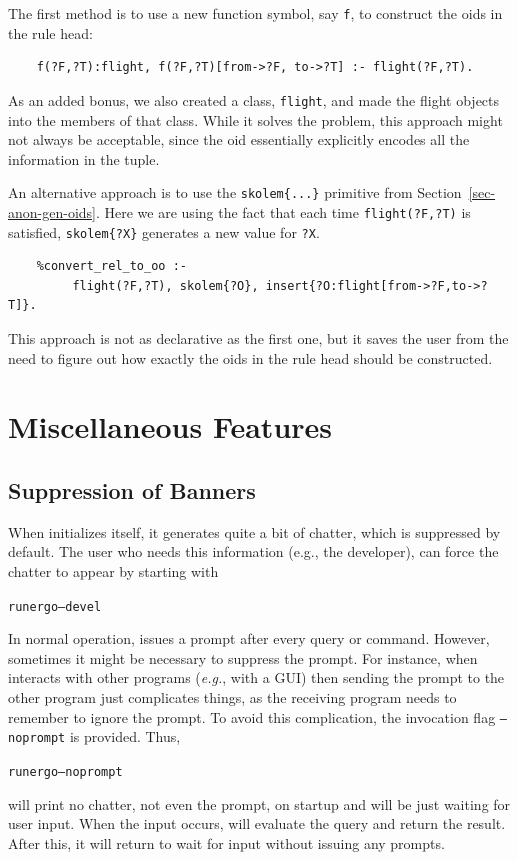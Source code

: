 \documentclass[11pt]{article}
\newcommand{\ERGO}{\mbox{\smaller{\ensuremath{\cal{E}}\smaller{{\sc{RGO}}}}}\xspace}
\newcommand{\FLSYSTEM}{\ERGO}
\newcommand{\ENGINERUN}{runergo}
\begin{document}
The first method is to use a new function symbol, say {\tt f}, to construct
the oids in the rule head:
\begin{verbatim}
    f(?F,?T):flight, f(?F,?T)[from->?F, to->?T] :- flight(?F,?T).  
\end{verbatim}
As an added bonus, we also created a class, {\tt flight}, and made the
flight objects into the members of that class. 
While it solves the problem, this approach might not always be acceptable,
since the oid essentially explicitly encodes all the information in the tuple.

An alternative approach is to use the {\tt skolem\{...\}} primitive from
Section~\ref{sec-anon-gen-oids}. Here we are using the fact that each time
{\tt flight(?F,?T)} is satisfied, {\tt skolem\{?X\}} generates a new value for
{\tt ?X}.    
\begin{verbatim}
    %convert_rel_to_oo :-
         flight(?F,?T), skolem{?O}, insert{?O:flight[from->?F,to->?T]}.
\end{verbatim}
This approach is not as declarative as the first one, but it saves the user
from the need to figure out how exactly the oids in the rule head should be
constructed.


\section{Miscellaneous Features}

\subsection{Suppression of Banners}
When \FLSYSTEM initializes itself, it generates quite a bit of chatter,
which is suppressed by default. The user who needs this information (e.g.,
the developer), can force the chatter to appear by starting \FLSYSTEM with
\begin{alltt}
 \ENGINERUN --devel
\end{alltt}

In normal operation, \FLSYSTEM issues a prompt after every query or
command. However, sometimes it might be necessary to suppress the prompt.
For instance, when \FLSYSTEM
interacts with other programs ({\it e.g.}, with a GUI) then sending the
prompt to the other program just complicates things, as the receiving
program needs to remember to ignore the prompt. To avoid this complication,
the invocation flag {\tt --noprompt} is provided. Thus,
\begin{alltt}
 \ENGINERUN --noprompt
\end{alltt}
will print no chatter, not even the prompt,
on startup and will be just waiting for user input. When
the input occurs, \FLSYSTEM will evaluate the query and return the result.
After this, it will return to wait for input without issuing any
prompts.
\end{document}
